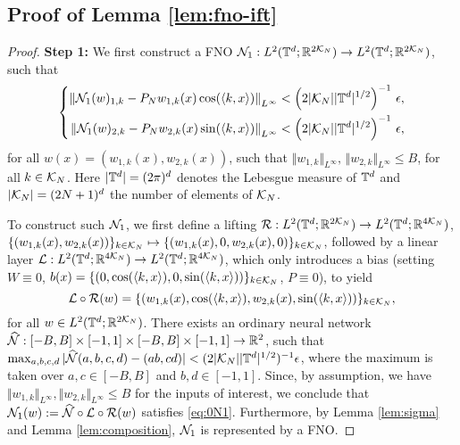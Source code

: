 \documentclass[reqno,a4paper]{amsart}
\begin{document}
\subsection{Proof of Lemma \ref{lem:fno-ift}}
\label{app:pfut2}
\begin{proof}
\textbf{Step 1:} We first construct a FNO $\mathcal{N}_1: L^2(\mathbb{T}^d;\mathbb{R}^{2\mathcal{K}_N}) \to L^2(\mathbb{T}^d;\mathbb{R}^{2\mathcal{K}_N})$, such that 
\begin{gather} \label{eq:0N1}
\left\{
\begin{aligned}
\left\Vert
\mathcal{N}_1(w)_{1,k}
-
P_N w_{1,k}(x) \cos(\langle k, x\rangle)
\right\Vert_{L^\infty} < \left(2|\mathcal{K}_N||\mathbb{T}^d|^{1/2}\right)^{-1}\,\epsilon, 
\\
\left\Vert
\mathcal{N}_1(w)_{2,k}
-
P_N w_{2,k}(x) \sin(\langle k, x\rangle)
\right\Vert_{L^\infty} < \left(2|\mathcal{K}_N||\mathbb{T}^d|^{1/2}\right)^{-1}\,\epsilon, 
\end{aligned}
\right.
\end{gather}
for all $w(x) = (w_{1,k}(x), w_{2,k}(x))$, such that $\Vert w_{1,k}\Vert_{L^\infty}, \, \Vert w_{2,k}\Vert_{L^\infty} \le B$, for all $k\in \mathcal{K}_N$. Here $|\mathbb{T}^d|=(2\pi)^d$ denotes the Lebesgue measure of $\mathbb{T}^d$ and $|\mathcal{K}_N|=(2N+1)^d$ the number of elements of $\mathcal{K}_N$. 

To construct such $\mathcal{N}_1$, we first define a lifting $\mathcal{R}: L^2(\mathbb{T}^d;\mathbb{R}^{2\mathcal{K}_N}) \to L^2(\mathbb{T}^d;\mathbb{R}^{4\mathcal{K}_N})$, $\{(w_{1,k}(x),w_{2,k}(x))\}_{k\in \mathcal{K}_N} \mapsto \{(w_{1,k}(x),0,w_{2,k}(x),0)\}_{k\in \mathcal{K}_N}$, followed by a linear layer $\mathcal{L}: L^2(\mathbb{T}^d;\mathbb{R}^{4\mathcal{K}_N}) \to L^2(\mathbb{T}^d;\mathbb{R}^{4\mathcal{K}_N})$, which only introduces a bias (setting $W\equiv 0$, $b(x) = \{(0,\cos(\langle k,x\rangle),0,\sin(\langle k,x\rangle))\}_{k\in \mathcal{K}_N}$, $P\equiv 0$), to yield 
\[
\mathcal{L}\circ \mathcal{R}(w) = \{(w_{1,k}(x),\cos(\langle k,x\rangle),w_{2,k}(x),\sin(\langle k,x\rangle))\}_{k\in \mathcal{K}_N},
\]
for all $w \in L^2(\mathbb{T}^d;\mathbb{R}^{2\mathcal{K}_N})$. There exists an ordinary neural network $\widehat{\mathcal{N}}: [-B,B] \times [-1,1] \times [-B,B]\times [-1,1] \to \mathbb{R}^2$, such that $\max_{a,b,c,d} |\widehat{\mathcal{N}}(a,b,c,d) - (ab,cd)| < (2|\mathcal{K}_N||\mathbb{T}^d|^{1/2})^{-1} \epsilon$, where the maximum is taken over $a,c\in [-B,B]$ and $b,d \in [-1,1]$. Since, by assumption, we have $\Vert w_{1,k} \Vert_{L^\infty}, \Vert w_{2,k}\Vert_{L^\infty} \le B$ for the inputs of interest, we conclude that 
$\mathcal{N}_1(w) := \widehat{\mathcal{N}} \circ \mathcal{L} \circ \mathcal{R}(w)$ satisfies \eqref{eq:0N1}. Furthermore, by Lemma \ref{lem:sigma} and Lemma \ref{lem:composition}, $\mathcal{N}_1$ is represented by a FNO.


\end{proof}
\end{document}
